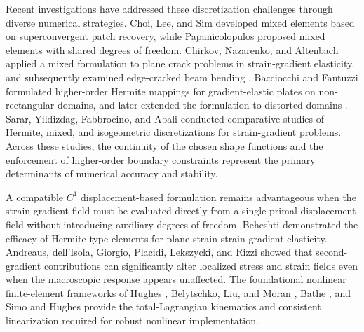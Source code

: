 \documentclass[preprint,12pt]{elsarticle}
\begin{document}
Recent investigations have addressed these discretization challenges
through diverse numerical strategies. Choi, Lee, and Sim
\cite{ChoiLeeSim2023} developed mixed elements based on superconvergent
patch recovery, while Papanicolopulos \cite{Papanicolopulos2024} proposed
mixed elements with shared degrees of freedom. Chirkov, Nazarenko, and
Altenbach \cite{ChirkovNazarenkoAltenbach2024} applied a mixed formulation to
plane crack problems in strain-gradient elasticity, and subsequently examined
edge-cracked beam bending \cite{ChirkovNazarenkoAltenbach2025}. Bacciocchi and
Fantuzzi \cite{BacciocchiFantuzzi2023} formulated higher-order Hermite
mappings for gradient-elastic plates on non-rectangular domains, and later
extended the formulation to distorted domains \cite{BacciocchiFantuzzi2025}.
Sarar, Yildizdag, Fabbrocino, and Abali
\cite{SararYildizdagFabbrocinoAbali2025} conducted comparative studies of
Hermite, mixed, and isogeometric discretizations for strain-gradient problems.
Across these studies, the continuity of the chosen shape functions and the
enforcement of higher-order boundary constraints represent the primary
determinants of numerical accuracy and stability.

A compatible $C^1$ displacement-based formulation remains advantageous when
the strain-gradient field must be evaluated directly from a single primal
displacement field without introducing auxiliary degrees of freedom.
Beheshti \cite{Beheshti2017} demonstrated the efficacy of Hermite-type
elements for plane-strain strain-gradient elasticity. Andreaus, dell'Isola,
Giorgio, Placidi, Lekszycki, and Rizzi
\cite{AndreausDellIsolaGiorgioPlacidiLekszyckiRizzi2016} showed that
second-gradient contributions can significantly alter localized stress and
strain fields even when the macroscopic response appears unaffected. The
foundational nonlinear finite-element frameworks of Hughes \cite{Hughes1987},
Belytschko, Liu, and Moran \cite{BelytschkoLiuMoran2000}, Bathe
\cite{Bathe2006}, and Simo and Hughes \cite{SimoHughes1998} provide the
total-Lagrangian kinematics and consistent linearization required for robust
nonlinear implementation.
\end{document}
